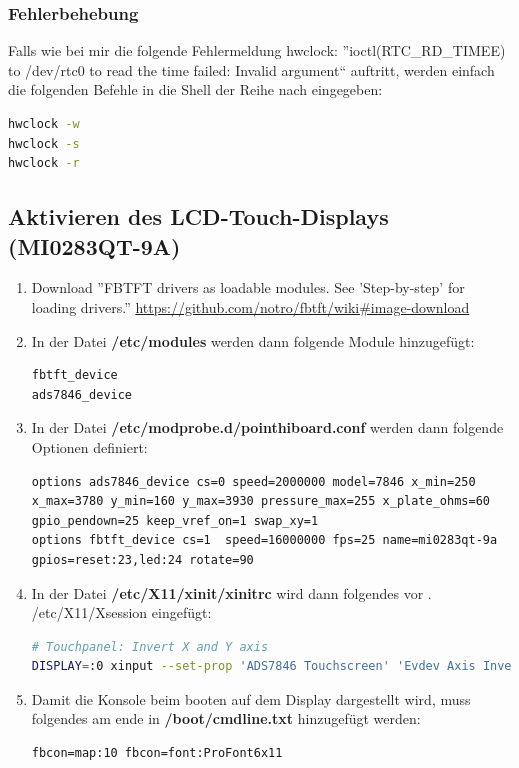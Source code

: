 \documentclass[a4paper,10pt]{article}
\newcommand{\path}[1]{\textcolor{pathcolor}{\textbf{#1}}} %
\begin{document}
\subsubsection{Fehlerbehebung}

Falls wie bei mir die folgende Fehlermeldung hwclock: ''ioctl(RTC\_RD\_TIMEE) to /dev/rtc0 to read the time failed: Invalid argument`` auftritt, werden einfach die folgenden Befehle in die Shell der Reihe nach eingegeben:
\begin{lstlisting}[language=sh]
hwclock -w
hwclock -s
hwclock -r
\end{lstlisting}

\subsection{Aktivieren des LCD-Touch-Displays (MI0283QT-9A)}
\let\thefootnote\relax{}
\let\thefootnote\relax{}
\let\thefootnote\relax{}

\begin{enumerate}
 \item Download ''FBTFT drivers as loadable modules. See 'Step-by-step' for loading drivers.'' \url{https://github.com/notro/fbtft/wiki#image-download}
 \item In der Datei \path{/etc/modules} werden dann folgende Module hinzugefügt:
    \begin{lstlisting}
fbtft_device
ads7846_device
    \end{lstlisting}
 \item In der Datei \path{/etc/modprobe.d/pointhiboard.conf} werden dann folgende Optionen definiert:
    \begin{lstlisting}
options ads7846_device cs=0 speed=2000000 model=7846 x_min=250 x_max=3780 y_min=160 y_max=3930 pressure_max=255 x_plate_ohms=60 gpio_pendown=25 keep_vref_on=1 swap_xy=1 
options fbtft_device cs=1  speed=16000000 fps=25 name=mi0283qt-9a gpios=reset:23,led:24 rotate=90
    \end{lstlisting}
 \item In der Datei \path{/etc/X11/xinit/xinitrc} wird dann folgendes vor . /etc/X11/Xsession eingefügt:
    \begin{lstlisting}[language=sh]
# Touchpanel: Invert X and Y axis
DISPLAY=:0 xinput --set-prop 'ADS7846 Touchscreen' 'Evdev Axis Inversion' 1 1
    \end{lstlisting}
 \item Damit die Konsole beim booten auf dem Display dargestellt wird, muss folgendes am ende in \path{/boot/cmdline.txt} hinzugefügt werden:
    \begin{lstlisting}
fbcon=map:10 fbcon=font:ProFont6x11
    \end{lstlisting}
\end{enumerate}
\end{document}
